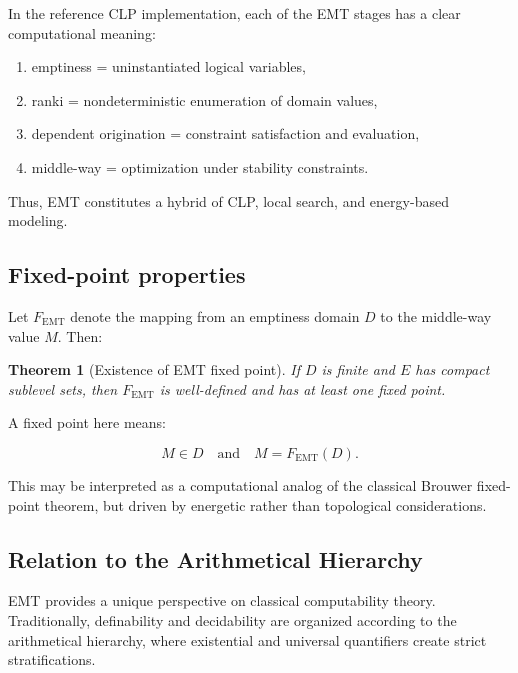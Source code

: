 \documentclass[11pt]{article}
\newtheorem{theorem}{Theorem}[section]
\theoremstyle{definition}
\theoremstyle{remark}
\begin{document}
In the reference CLP implementation, each of the EMT stages has a
clear computational meaning:

\begin{enumerate}
   \item emptiness = uninstantiated logical variables,
   \item ranki = nondeterministic enumeration of domain values,
   \item dependent origination = constraint satisfaction and evaluation,
   \item middle-way = optimization under stability constraints.
\end{enumerate}

Thus, EMT constitutes a hybrid of CLP, local search, and energy-based
modeling.

\subsection{Fixed-point properties}

Let $F_{\mathrm{EMT}}$ denote the mapping from an emptiness domain
$D$ to the middle-way value $M$. Then:

\begin{theorem}[Existence of EMT fixed point]
If $D$ is finite and $E$ has compact sublevel sets, then 
$F_{\mathrm{EMT}}$ is well-defined and has at least one fixed point.
\end{theorem}

A fixed point here means:

\[
  M \in D \quad\text{and}\quad M = F_{\mathrm{EMT}}(D).
\]

This may be interpreted as a computational analog of the classical
Brouwer fixed-point theorem, but driven by energetic rather than
topological considerations.


\subsection{Relation to the Arithmetical Hierarchy}

EMT provides a unique perspective on classical computability theory.
Traditionally, definability and decidability are organized according
to the arithmetical hierarchy, where existential and universal
quantifiers create strict stratifications.
\end{document}
